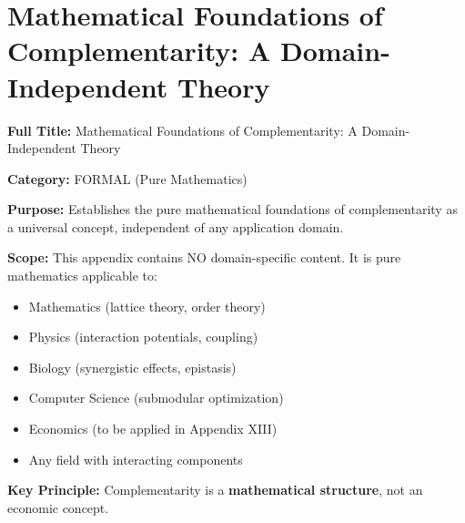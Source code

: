 
\chapter{Mathematical Foundations of Complementarity: A Domain-Independent Theory}
\label{app:formal-found}

\begin{tcolorbox}[colback=blue!5!white,colframe=blue!75!black,title=\textbf{Appendix X: FORMAL-FOUND}]
\textbf{Full Title:} Mathematical Foundations of Complementarity: A Domain-Independent Theory

\textbf{Category:} FORMAL (Pure Mathematics)

\textbf{Purpose:} Establishes the pure mathematical foundations of complementarity as a universal concept, independent of any application domain.

\textbf{Scope:} This appendix contains NO domain-specific content. It is pure mathematics applicable to:
\begin{itemize}[noitemsep]
    \item Mathematics (lattice theory, order theory)
    \item Physics (interaction potentials, coupling)
    \item Biology (synergistic effects, epistasis)
    \item Computer Science (submodular optimization)
    \item Economics (to be applied in Appendix XIII)
    \item Any field with interacting components
\end{itemize}

\textbf{Key Principle:} Complementarity is a \textbf{mathematical structure}, not an economic concept.
\end{tcolorbox}

